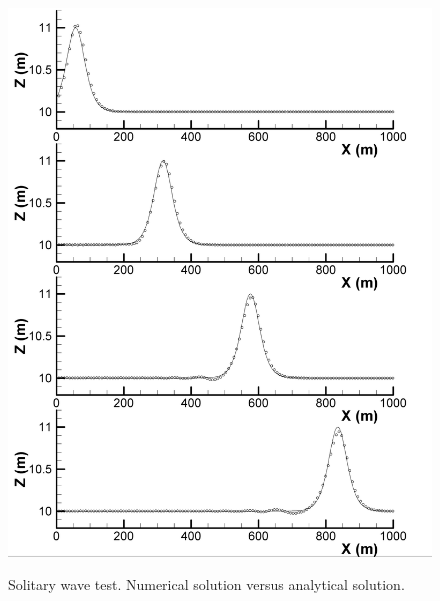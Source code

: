 \begin{figure}[htbp]
\hspace{0.5in}
\includegraphics[width=4.5in]{../figures/SoliWav/SoliWav-LongCh-Ana-Num-Compar.pdf}
\label{fig:SoliWav-LongCh-Anal-Num-Compar}
\caption{Solitary wave test. Numerical solution versus analytical solution.}
\end{figure}

\cp
